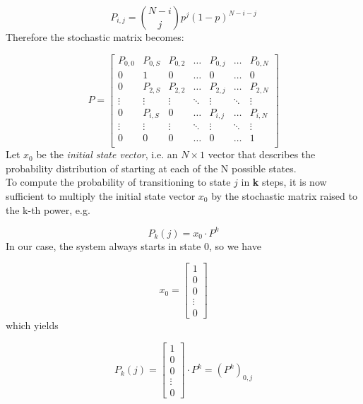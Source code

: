  \begin{equation}
	P_{i,j} = {N-i\choose j} p^{j} (1-p)^{N-i-j}
	\label{eq:matrixElementProb}
\end{equation}
\hfill \break
Therefore the stochastic matrix becomes:

\begin{equation*}
P = 
\begin{bmatrix}
P_{0,0}	& P_{0,S}	& P_{0,2}	& \dots  	& P_{0,j}	& \dots		& P_{0,N} \\
0		& 1			& 0			& \dots  	& 0			& \dots		& 0		 \\
0		& P_{2,S}	& P_{2,2}	& \dots  	& P_{2,j}	& \dots		& P_{2,N} \\
\vdots	& \vdots	& \vdots	& \ddots 	& \vdots	& \ddots	& \vdots \\
0		& P_{i,S}	& 0			& \dots		& P_{i,j}	& \dots		& P_{i,N} \\
\vdots	& \vdots	& \vdots	& \ddots	& \vdots	& \ddots	& \vdots \\
0		& 0			& 0			& \dots  	& 0			& \dots		& 1		 \\
\end{bmatrix}
\label{stochasticMatrix2}
\end{equation*}
\hfill \break
Let $x_{0}$ be the \textit{initial state vector}, i.e. an $N \times 1$ vector that describes the probability distribution of starting at each of the N possible states.\\
To compute the probability of transitioning to state $j$ in \textbf{k} steps, it is now sufficient to multiply the initial state vector $x_{0}$ by the stochastic matrix raised to the k-th power, e.g.

\begin{equation}\label{probAtStateK1}
P_{k}(j) = x_{0}\cdot P^{k}
\end{equation}
\hfill \break
In our case, the system always starts in state 0, so we have

\begin{equation*}
x_{0} = 
\begin{bmatrix}
1 \\
0 \\
0 \\
\vdots \\
0
\end{bmatrix}
\label{initialStateVector}
\end{equation*}
\hfill \break
which yields

\begin{equation}
P_{k}(j) = 
\begin{bmatrix}
1 \\
0 \\
0 \\
\vdots \\
0
\end{bmatrix}
\cdot P^{k} = (P^{k})_{0,j}
\label{eq:Pk_of_j}
\end{equation}
\hfill \break

